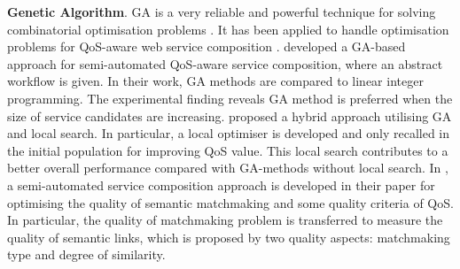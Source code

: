 \textbf{Genetic Algorithm}. 
GA is a very reliable and powerful technique for solving combinatorial optimisation problems \cite{srinivas1994genetic}. It has been applied to handle optimisation problems for QoS-aware web service composition \cite{wang2012survey}. \cite{canfora2005approach} developed a GA-based approach for semi-automated QoS-aware service composition, where an abstract workflow is given. In their work, GA methods are compared to linear integer programming. The experimental finding reveals GA method is preferred when the size of service candidates are increasing.  \cite{tang2010hybrid} proposed a hybrid approach utilising GA and local search. In particular, a local optimiser is developed and only recalled in the initial population for improving QoS value. This local search contributes to a better overall performance compared with GA-methods without local search. In \cite{lecue2009optimizing},  a semi-automated service composition approach is developed in their paper for optimising the quality of semantic matchmaking and some quality criteria of QoS. In particular, the quality of matchmaking problem is transferred to measure the quality of semantic links, which is proposed by two quality aspects: matchmaking type and degree of similarity.

